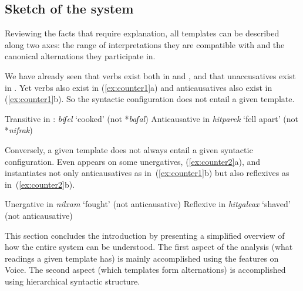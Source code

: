 \begin{exe}
\begin{xlist}
\begin{exe}
\begin{exe}
\begin{exe}
\begin{exe}
\begin{xlist}
\begin{exe}
\begin{xlist}
\begin{xlist}
\begin{xlist}
\begin{exe}
\begin{xlist}
\begin{exe}
\begin{exe}
\begin{xlist}
\begin{exe}
\begin{xlist}
\begin{exe}
\begin{exe}
\begin{xlist}
\begin{exe}
\begin{xlist}
\begin{exe}
\begin{xlist}
\begin{exe}
\begin{exe}
\begin{xlist}
\begin{exe}
\begin{exe}
\begin{xlist}
\begin{exe}
\begin{xlist}
\begin{exe}
\begin{xlist}
\begin{xlist}
\begin{exe}
\section{Sketch of the system} \label{intro:sketch}
Reviewing the facts that require explanation, all templates can be described along two axes: the range of interpretations they are compatible with and the canonical alternations they participate in.

We have already seen that  verbs exist both in {\tkal} and {\thif}, and that unaccusatives exist in {\tnif}. Yet  verbs also exist in {\tpie} (\ref{ex:counter1}a) and anticausatives also exist in {\thit} (\ref{ex:counter1}b). So the syntactic configuration does not entail a given template.
 \begin{exe}
 	\ex \label{ex:counter1}
 	\begin{xlist}
 		\ex Transitive in {\tpie}: \emph{biʃel} `cooked' (not {\tkal} *\emph{baʃal})
 		\ex Anticausative in {\thit} \emph{hitparek} `fell apart' (not {\tnif} *\emph{nifrak})
 \z 
 \z

Conversely, a given template does not always entail a given syntactic configuration. Even {\tnif} appears on some unergatives, (\ref{ex:counter2}a), and {\thit} instantiates not only anticausatives as in~(\ref{ex:counter1}b) but also reflexives as in~(\ref{ex:counter2}b).
\begin{exe}
	\ex \label{ex:counter2}
	\begin{xlist}
		\ex  Unergative in {\tnif} \emph{nilxam} `fought' (not anticausative)
		\ex Reflexive in {\thit} \emph{hitgaleax} `shaved' (not anticausative)
\z
\z

This section concludes the introduction by presenting a simplified overview of how the entire system can be understood. The first aspect of the analysis (what readings a given template has) is mainly accomplished using the features on Voice. The second aspect (which templates form alternations) is accomplished using hierarchical syntactic structure.


\end{xlist}
\end{exe}
\end{xlist}
\end{exe}
\end{exe}
\end{xlist}
\end{xlist}
\end{exe}
\end{xlist}
\end{exe}
\end{xlist}
\end{exe}
\end{exe}
\end{xlist}
\end{exe}
\end{exe}
\end{xlist}
\end{exe}
\end{xlist}
\end{exe}
\end{xlist}
\end{exe}
\end{exe}
\end{xlist}
\end{exe}
\end{xlist}
\end{exe}
\end{exe}
\end{xlist}
\end{exe}
\end{xlist}
\end{xlist}
\end{xlist}
\end{exe}
\end{xlist}
\end{exe}
\end{exe}
\end{exe}
\end{exe}
\end{xlist}
\end{exe}
